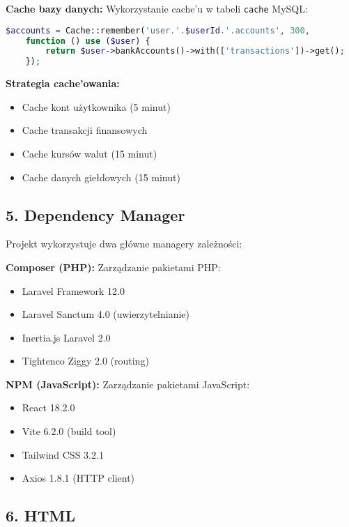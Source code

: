 \documentclass[12pt,a4paper]{article}
\begin{document}
    \textbf{Cache bazy danych:} Wykorzystanie cache'u w tabeli \texttt{cache} MySQL:
    \begin{lstlisting}[language=PHP]
$accounts = Cache::remember('user.'.$userId.'.accounts', 300,
    function () use ($user) {
        return $user->bankAccounts()->with(['transactions'])->get();
    });
    \end{lstlisting}

    \textbf{Strategia cache'owania:}
    \begin{itemize}
        \item Cache kont użytkownika (5 minut)
        \item Cache transakcji finansowych
        \item Cache kursów walut (15 minut)
        \item Cache danych giełdowych (15 minut)
    \end{itemize}

    \subsection{5. Dependency Manager}

    Projekt wykorzystuje dwa główne managery zależności:

    \textbf{Composer (PHP):} Zarządzanie pakietami PHP:
    \begin{itemize}
        \item Laravel Framework 12.0
        \item Laravel Sanctum 4.0 (uwierzytelnianie)
        \item Inertia.js Laravel 2.0
        \item Tightenco Ziggy 2.0 (routing)
    \end{itemize}

    \textbf{NPM (JavaScript):} Zarządzanie pakietami JavaScript:
    \begin{itemize}
        \item React 18.2.0
        \item Vite 6.2.0 (build tool)
        \item Tailwind CSS 3.2.1
        \item Axios 1.8.1 (HTTP client)
    \end{itemize}

    \subsection{6. HTML}
\end{document}
